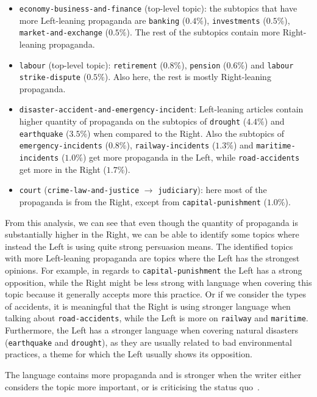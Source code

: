 \begin{itemize}
    \item \texttt{economy-business-and-finance} (top-level topic): the subtopics that have more Left-leaning propaganda  are \texttt{banking} ($0.4\%$), \texttt{investments} ($0.5\%$), \texttt{market-and-exchange} ($0.5\%$). The rest of the subtopics contain more Right-leaning propaganda.
    \item \texttt{labour} (top-level topic): \texttt{retirement} ($0.8\%$), \texttt{pension} ($0.6\%$) and \texttt{labour} \texttt{strike-dispute} ($0.5\%$). Also here, the rest is mostly Right-leaning propaganda.
    \item \texttt{disaster-accident-and-emergency-incident}: Left-leaning articles contain higher quantity of propaganda on the subtopics of \texttt{drought} ($4.4\%$) and \texttt{earthquake} ($3.5\%$) when compared to the Right. Also the subtopics of \texttt{emergency-incidents} ($0.8\%$), \texttt{railway-incidents} ($1.3\%$) and \texttt{maritime-incidents} ($1.0\%$) get more propaganda in the Left, while \texttt{road-accidents} get more in the Right ($1.7\%$).
    \item \texttt{court} (\texttt{crime-law-and-justice} $\rightarrow$ \texttt{judiciary}): here most of the propaganda is from the Right, except from \texttt{capital-punishment} ($1.0\%$).
\end{itemize}

From this analysis, we can see that even though the quantity of propaganda is substantially higher in the Right, we can be able to identify some topics where instead the Left is using quite strong persuasion means.
The identified topics with more Left-leaning propaganda are topics where the Left has the strongest opinions. For example, in regards to \texttt{capital-punishment} the Left has a strong opposition, while the Right might be less strong with language when covering this topic because it generally accepts more this practice.
Or if we consider the types of accidents, it is meaningful that the Right is using stronger language when talking about \texttt{road-accidents}, while the Left is more on \texttt{railway} and \texttt{maritime}. Furthermore, the Left has a stronger language when covering natural disasters (\texttt{earthquake} and \texttt{drought}), as they are usually related to bad environmental practices, a theme for which the Left usually shows its opposition.

The language contains more propaganda and is stronger when the writer either considers the topic more important, or is criticising the status quo~\citep{rose1992political}.



